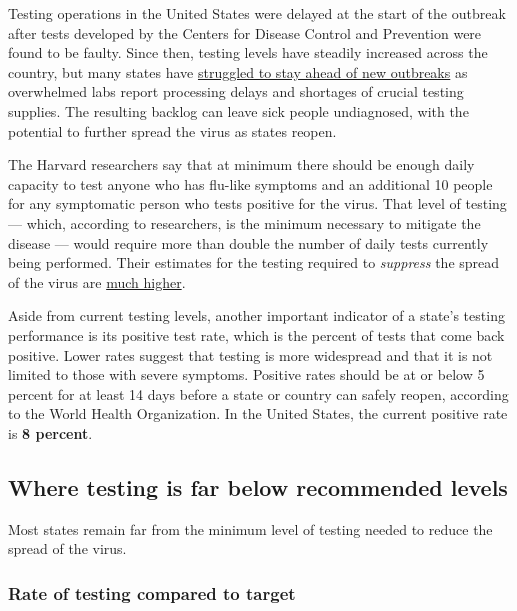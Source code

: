 Testing operations in the United States were delayed at the start of the
outbreak after tests developed by the Centers for Disease Control and
Prevention were found to be faulty. Since then, testing levels have
steadily increased across the country, but many states have
\href{https://www.nytimes3xbfgragh.onion/2020/07/06/us/coronavirus-test-shortage.html}{struggled
to stay ahead of new outbreaks} as overwhelmed labs report processing
delays and shortages of crucial testing supplies. The resulting backlog
can leave sick people undiagnosed, with the potential to further spread
the virus as states reopen.

The Harvard researchers say that at minimum there should be enough daily
capacity to test anyone who has flu-like symptoms and an additional 10
people for any symptomatic person who tests positive for the virus. That
level of testing --- which, according to researchers, is the minimum
necessary to mitigate the disease --- would require more than double the
number of daily tests currently being performed. Their estimates for the
testing required to \emph{suppress} the spread of the virus are
\href{https://globalepidemics.org/july-6-2020-state-testing-targets/}{much
higher}.

Aside from current testing levels, another important indicator of a
state's testing performance is its positive test rate, which is the
percent of tests that come back positive. Lower rates suggest that
testing is more widespread and that it is not limited to those with
severe symptoms. Positive rates should be at or below 5 percent for at
least 14 days before a state or country can safely reopen, according to
the World Health Organization. In the United States, the current
positive rate is \textbf{8 percent}.

\hypertarget{where-testing-is-far-below-recommended-levels}{%
\subsection{Where testing is far below recommended
levels}\label{where-testing-is-far-below-recommended-levels}}

Most states remain far from the minimum level of testing needed to
reduce the spread of the virus.

\hypertarget{rate-of-testing-compared-to-target}{%
\subsubsection{Rate of testing compared to
target}\label{rate-of-testing-compared-to-target}}

